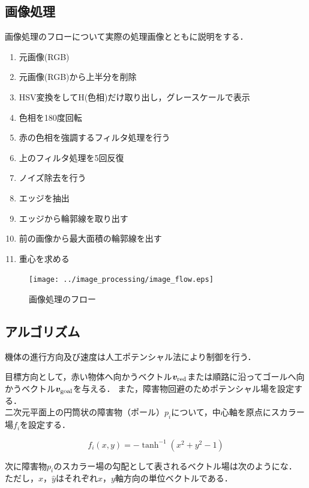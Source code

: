 \documentclass[11pt,a4]{jsarticle}
\begin{document}
\newpage
\subsection{画像処理}
画像処理のフローについて実際の処理画像とともに説明をする．

\begin{enumerate}
 \item 元画像(RGB)
 \item 元画像(RGB)から上半分を削除
 \item HSV変換をしてH(色相)だけ取り出し，グレースケールで表示
 \item 色相を180度回転
 \item 赤の色相を強調するフィルタ処理を行う
 \item 上のフィルタ処理を5回反復
 \item ノイズ除去を行う
 \item エッジを抽出
 \item エッジから輪郭線を取り出す
 \item 前の画像から最大面積の輪郭線を出す
 \item 重心を求める
\end{enumerate}

\begin{figure}[h]
  \begin{flushleft}
    \texttt{[image: ../image\_processing/image\_flow.eps]}
    \caption{画像処理のフロー}
    \label{image_flow}
  \end{flushleft}
\end{figure}

\newpage
\subsection{アルゴリズム} 

  機体の進行方向及び速度は人工ポテンシャル法により制御を行う．

  目標方向として，赤い物体へ向かうベクトル$\bm{v}_{\rm{red}}$または順路に沿ってゴールへ向かうベクトル$\bm{v}_{\rm{goal}}$を与える．
  また，障害物回避のためポテンシャル場を設定する．\\

  二次元平面上の円筒状の障害物（ポール）$p_i$について，中心軸を原点にスカラー場$f_i$を設定する．

  \begin{equation}
    f_i(x,y) = - \tanh^{-1}(x^2 + y^2 - 1)
  \end{equation}

  次に障害物$p_i$のスカラー場の勾配として表されるベクトル場は次のようにな．
  ただし，$\hat{x}$，$\hat{y}$はそれぞれ$x$，$y$軸方向の単位ベクトルである．
\end{document}
